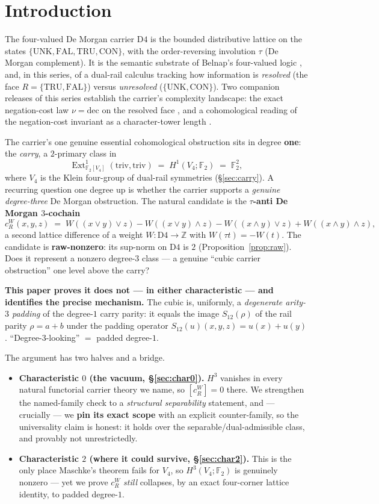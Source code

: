 \documentclass[11pt]{article}
\theoremstyle{definition}
\theoremstyle{remark}
\newcommand{\F}{\mathbb{F}}
\newcommand{\Z}{\mathbb{Z}}
\newcommand{\UNK}{\mathrm{UNK}}
\newcommand{\TRU}{\mathrm{TRU}}
\newcommand{\FAL}{\mathrm{FAL}}
\newcommand{\CON}{\mathrm{CON}}
\newcommand{\Dfour}{\mathrm{D4}}
\newcommand{\Ext}{\operatorname{Ext}}
\newcommand{\cR}{c_R^W}
\begin{document}
\section{Introduction}

The four-valued De Morgan carrier $\Dfour$ is the bounded distributive lattice on the states $\{\UNK,\FAL,\TRU,\CON\}$, with the order-reversing involution $\tau$ (De Morgan complement). It is the semantic substrate of Belnap's four-valued logic \cite{belnap}, and, in this series, of a dual-rail calculus tracking how information is \emph{resolved} (the face $R=\{\TRU,\FAL\}$) versus \emph{unresolved} ($\{\UNK,\CON\}$). Two companion releases of this series establish the carrier's complexity landscape: the exact negation-cost law $\nu=\mathrm{dec}$ on the resolved face \cite{wcy2}, and a cohomological reading of the negation-cost invariant as a character-tower length \cite{cohom}.

The carrier's one genuine essential cohomological obstruction sits in degree \textbf{one}: the \emph{carry}, a $2$-primary class in
\[
\Ext^1_{\F_2[V_4]}(\mathrm{triv},\mathrm{triv}) \;=\; H^1(V_4;\F_2) \;=\; \F_2^2,
\]
where $V_4$ is the Klein four-group of dual-rail symmetries (\S\ref{sec:carry}). A recurring question one degree up is whether the carrier supports a \emph{genuine degree-three} De Morgan obstruction. The natural candidate is the \textbf{$\tau$-anti De Morgan $3$-cochain}
\[
\cR(x,y,z) \;=\; W((x\vee y)\vee z) - W((x\vee y)\wedge z) - W((x\wedge y)\vee z) + W((x\wedge y)\wedge z),
\]
a second lattice difference of a weight $W:\Dfour\to\Z$ with $W(\tau t)=-W(t)$. The candidate is \textbf{raw-nonzero}: its sup-norm on $\Dfour$ is $2$ (Proposition~\ref{prop:raw}). Does it represent a nonzero degree-$3$ class --- a genuine ``cubic carrier obstruction'' one level above the carry?

\textbf{This paper proves it does not --- in either characteristic --- and identifies the precise mechanism.} The cubic is, uniformly, a \emph{degenerate arity-$3$ padding} of the degree-$1$ carry parity: it equals the image $S_{12}(\rho)$ of the rail parity $\rho=a+b$ under the padding operator $S_{12}(u)(x,y,z)=u(x)+u(y)$. ``Degree-$3$-looking'' $=$ padded degree-$1$.

The argument has two halves and a bridge.
\begin{itemize}
\item \textbf{Characteristic $0$ (the vacuum, \S\ref{sec:char0}).} $H^3$ vanishes in every natural functorial carrier theory we name, so $[\cR]=0$ there. We strengthen the named-family check to a \emph{structural separability} statement, and --- crucially --- we \textbf{pin its exact scope} with an explicit counter-family, so the universality claim is honest: it holds over the separable/dual-admissible class, and provably not unrestrictedly.
\item \textbf{Characteristic $2$ (where it could survive, \S\ref{sec:char2}).} This is the only place Maschke's theorem fails for $V_4$, so $H^3(V_4;\F_2)$ is genuinely nonzero --- yet we prove $\cR$ \emph{still} collapses, by an exact four-corner lattice identity, to padded degree-$1$.
\end{itemize}
\end{document}

